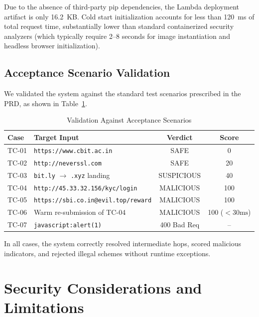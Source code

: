 \documentclass[10pt,conference,letterpaper]{IEEEtran}
\begin{document}
Due to the absence of third-party pip dependencies, the Lambda deployment artifact is only 16.2~KB. Cold start initialization accounts for less than 120~ms of total request time, substantially lower than standard containerized security analyzers (which typically require 2--8 seconds for image instantiation and headless browser initialization).

\subsection{Acceptance Scenario Validation}
We validated the system against the standard test scenarios prescribed in the PRD, as shown in Table~\ref{tab:acceptance}.

\begin{table}[h]
\centering
\caption{Validation Against Acceptance Scenarios}
\label{tab:acceptance}
\begin{tabularx}{\linewidth}{l X c c}
\toprule
\textbf{Case} & \textbf{Target Input} & \textbf{Verdict} & \textbf{Score} \\
\midrule
TC-01 & \texttt{https://www.cbit.ac.in} & SAFE & 0 \\
TC-02 & \texttt{http://neverssl.com} & SAFE & 20 \\
TC-03 & \texttt{bit.ly} $\rightarrow$ \texttt{.xyz} landing & SUSPICIOUS & 40 \\
TC-04 & \texttt{http://45.33.32.156/kyc/login} & MALICIOUS & 100 \\
TC-05 & \texttt{https://sbi.co.in@evil.top/reward} & MALICIOUS & 100 \\
TC-06 & Warm re-submission of TC-04 & MALICIOUS & 100 ($< 30\text{ms}$) \\
TC-07 & \texttt{javascript:alert(1)} & 400 Bad Req & -- \\
\bottomrule
\end{tabularx}
\end{table}

In all cases, the system correctly resolved intermediate hops, scored malicious indicators, and rejected illegal schemes without runtime exceptions.

\section{Security Considerations and Limitations}
\end{document}
